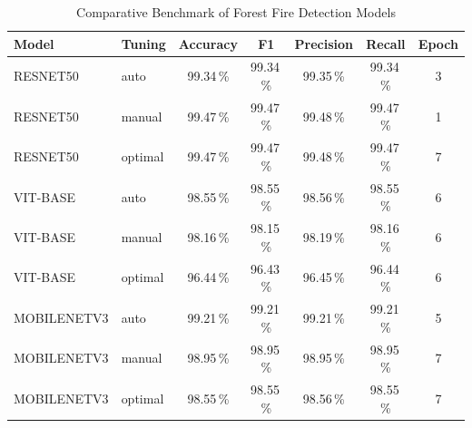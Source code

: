 \begin{table}[ht]
\centering
\caption{Comparative Benchmark of Forest Fire Detection Models}
\label{tab:benchmark}
\begin{tabular}{llccccc}
\toprule
Model & Tuning & \multicolumn{1}{c}{Accuracy} & \multicolumn{1}{c}{F1} & \multicolumn{1}{c}{Precision} & \multicolumn{1}{c}{Recall} & Epoch \\
\midrule
RESNET50 & auto & 99.34$\,$\% & 99.34$\,$\% & 99.35$\,$\% & 99.34$\,$\% & 3 \\
RESNET50 & manual & 99.47$\,$\% & 99.47$\,$\% & 99.48$\,$\% & 99.47$\,$\% & 1 \\
RESNET50 & optimal & 99.47$\,$\% & 99.47$\,$\% & 99.48$\,$\% & 99.47$\,$\% & 7 \\
VIT-BASE & auto & 98.55$\,$\% & 98.55$\,$\% & 98.56$\,$\% & 98.55$\,$\% & 6 \\
VIT-BASE & manual & 98.16$\,$\% & 98.15$\,$\% & 98.19$\,$\% & 98.16$\,$\% & 6 \\
VIT-BASE & optimal & 96.44$\,$\% & 96.43$\,$\% & 96.45$\,$\% & 96.44$\,$\% & 6 \\
MOBILENETV3 & auto & 99.21$\,$\% & 99.21$\,$\% & 99.21$\,$\% & 99.21$\,$\% & 5 \\
MOBILENETV3 & manual & 98.95$\,$\% & 98.95$\,$\% & 98.95$\,$\% & 98.95$\,$\% & 7 \\
MOBILENETV3 & optimal & 98.55$\,$\% & 98.55$\,$\% & 98.56$\,$\% & 98.55$\,$\% & 7 \\
\bottomrule
\end{tabular}
\end{table}
